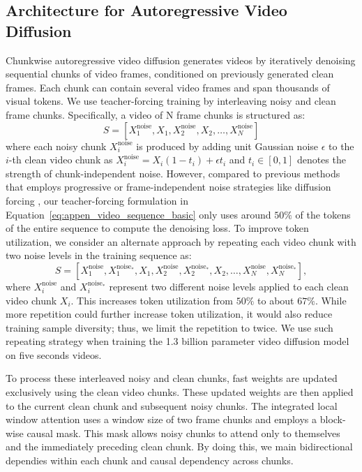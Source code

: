 \documentclass{article}
\begin{document}
\subsection{\methodname{} Architecture for Autoregressive Video Diffusion}
\label{sec:appen_video_model_arch}

Chunkwise autoregressive video diffusion generates videos by iteratively denoising sequential chunks of video frames, conditioned on previously generated clean frames. Each chunk can contain several video frames and span thousands of visual tokens.
We use teacher-forcing training by interleaving noisy and clean frame chunks. Specifically, a video of N frame chunks is structured as:
\begin{equation}
    S = [X_1^{\text{noise}}, X_1, X_2^{\text{noise}}, X_2, \ldots, X_N^{\text{noise}}]
    \label{eq:appen_video_sequence_basic}
\end{equation}
where each noisy chunk $X_i^{\text{noise}}$ is produced by adding unit Gaussian noise $\epsilon$ to the $i$-th clean video chunk as $X_i^{\text{noise}} = X_i (1 - t_i) + \epsilon t_i$ and $t_i \in [0, 1]$ denotes the strength of chunk-independent noise.  However, compared to previous methods that employs progressive \cite{ruhe2024rolling} or frame-independent noise strategies \cite{yin2024slow} like diffusion forcing \cite{chen2024diffusion},
our teacher-forcing formulation in Equation~\ref{eq:appen_video_sequence_basic} only uses around $50\%$ of the tokens of the entire sequence to compute the denoising loss. To improve token utilization, we consider an alternate approach by repeating each video chunk with two noise levels in the training sequence as:
\begin{equation}
    S = [X_1^{\text{noise}}, X_1^{\text{noise}_*},  X_1, X_2^{\text{noise}}, X_2^{\text{noise}_*},  X_2, \ldots, X_N^{\text{noise}}, X_N^{\text{noise}_*} ],
    \label{eq:video_sequence}
\end{equation}
where $X_i^{\text{noise}}$ and $X_i^{\text{noise}_*}$ represent two different noise levels applied to each clean video chunk $X_i$. This increases token utilization from $50\%$ to about $67\%$. While more repetition could further increase token utilization, it would also reduce training sample diversity; thus, we limit the repetition to twice. We use such repeating strategy when training the 1.3 billion parameter video diffusion model on five seconds videos. 

To process these interleaved noisy and clean chunks,  \methodname{} fast weights are updated exclusively using the clean video chunks. These updated weights are then applied to the current clean chunk and subsequent noisy chunks. The integrated local window attention uses a window size of two frame chunks and employs a block-wise causal mask. This mask allows noisy chunks to attend only to themselves and the immediately preceding clean chunk. By doing this, we main bidirectional dependies within each chunk and causal dependency across chunks. 
\end{document}

